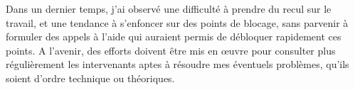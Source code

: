 \documentclass[a4paper,11pt]{article}
\begin{document}
Dans un dernier temps, j'ai observé une difficulté à prendre du recul sur le travail, et une tendance à s'enfoncer sur des points de blocage, sans parvenir à formuler des appels à l'aide qui auraient permis de débloquer rapidement ces points. A l'avenir, des efforts doivent être mis en œuvre pour consulter plus régulièrement les intervenants aptes à résoudre mes éventuels problèmes, qu'ils soient d'ordre technique ou théoriques.



{}

\end{document}
